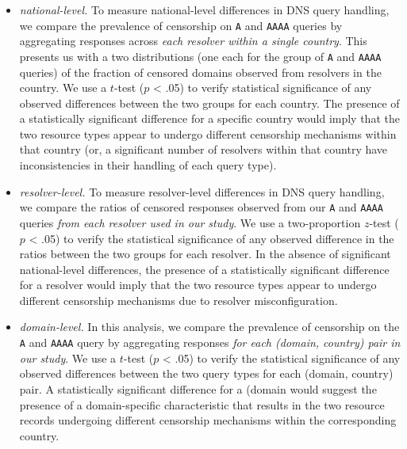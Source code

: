 \begin{itemize}
  \item {\it national-level.} To measure national-level differences in DNS query
    handling, we compare the prevalence of censorship on {\tt A} and {\tt AAAA}
    queries by aggregating responses across \emph{each resolver within a single
    country}. This presents us with a two distributions (one each for the group
    of {\tt A} and {\tt AAAA} queries) of the fraction of censored domains
    observed from resolvers in the country.
    We use a $t$-test ($p$ < .05) to verify statistical significance of any
    observed differences between the two groups for each country. The presence
    of a statistically significant difference for a specific country would
    imply that the two resource types appear to undergo different censorship
    mechanisms within that country (or, a significant number of resolvers
    within that country have inconsistencies in their handling of each query
    type).

  \item {\it resolver-level.} To measure resolver-level differences in DNS
    query handling, we compare the ratios of censored responses observed from
    our {\tt A} and {\tt AAAA} queries \emph{from each resolver used in our
    study}. 
    We use a two-proportion $z$-test ($p$ < .05) to verify the statistical
    significance of any observed difference in the ratios between the two
    groups for each resolver. In the absence of significant national-level
    differences, the presence of a statistically significant difference for
    a resolver would imply that the two resource types appear to undergo
    different censorship mechanisms due to resolver misconfiguration.

  \item {\it domain-level.} In this analysis, we compare the prevalence of
    censorship on the {\tt A} and {\tt AAAA} query by aggregating responses
    \emph{for each (domain, country) pair in our study}.
    We use a $t$-test ($p$ < .05) to verify the statistical significance of any
    observed differences between the two query types for each (domain, country)
    pair. A statistically significant difference for a (domain would suggest
    the presence of a domain-specific characteristic that results in the two
    resource records undergoing different censorship mechanisms within the
    corresponding country.
\end{itemize}


